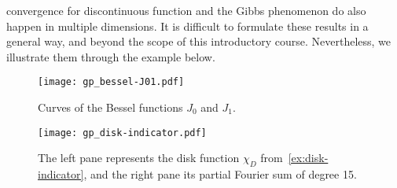 convergence for discontinuous function and the Gibbs phenomenon do also happen in multiple
dimensions. It is difficult to formulate these results in a general way, and beyond the
scope of this introductory course. Nevertheless, we illustrate them through the example
below.
\begin{figure}[t]
  \centering
  \texttt{[image: gp\_bessel-J01.pdf]}
  \caption{Curves of the Bessel functions $J_0$ and $J_1$.}
  \label{fig:bessel-J01}
\end{figure}
\begin{figure}[t]
  \centering
  \texttt{[image: gp\_disk-indicator.pdf]}
  \caption{The left pane represents the disk function $\chi_D$
  from~\cref{ex:disk-indicator}, and the right pane its partial Fourier sum of degree 15.}
  \label{fig:disk-indicator}
\end{figure}
